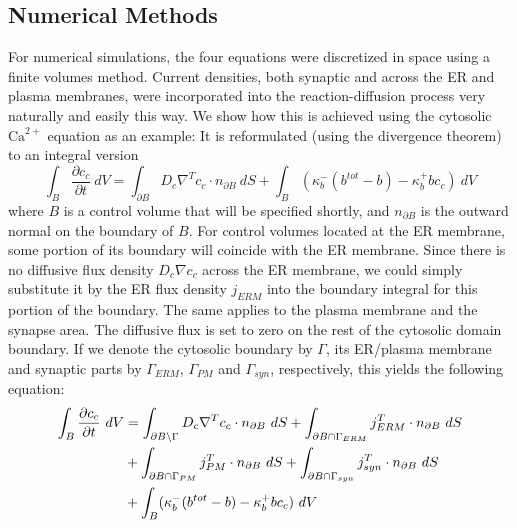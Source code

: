\documentclass[12pt]{article}
\begin{document}
\subsection*{Numerical Methods} For numerical simulations, the four equations were discretized in space using a finite volumes method. Current densities, both synaptic and across the ER and plasma membranes, were incorporated into the reaction-diffusion process very naturally and easily this way. We show how this is achieved using the cytosolic $\textrm{Ca}^{2+}$ equation as an example: It is reformulated (using the divergence theorem) to an integral version 
\begin{equation}
    \int_B \frac{\partial c_c}{\partial t}\ dV = \int_{\partial B}D_c\nabla^Tc_c\cdot n_{\partial B}\ dS + \int_B (\kappa_b^-(b^{tot}-b)-\kappa_b^+bc_c)\ dV
\end{equation}
where $B$ is a control volume that will be specified shortly, and $n_{\partial B}$ is the outward normal on the boundary of $B$. For control volumes located at the ER membrane, some portion of its boundary will coincide with the ER membrane. Since there is no diffusive flux density $D_c\nabla c_c$ across the ER membrane, we could simply substitute it by the ER flux density $j_{ERM}$ into the boundary integral for this portion of the boundary. The same applies to the plasma membrane and the synapse area. The diffusive flux is set to zero on the rest of the cytosolic domain
boundary. If we denote the cytosolic boundary by $\Gamma$, its ER/plasma membrane and synaptic parts by $\Gamma_{ERM}$, $\Gamma_{PM}$ and $\Gamma_{syn}$, respectively, this yields the following equation:
\begin{align}
    \int_B \frac{\partial c_c}{\partial t}\ dV &=\int_{\partial B\setminus\Gamma}D_c\nabla^Tc_c\cdot n_{\partial B}\ dS+\int_{\partial B\cap \Gamma_{ERM}}j_{ERM}^T\cdot n_{\partial B}\ dS\notag \\
    &+\int_{\partial B\cap \Gamma_{PM}}j_{PM}^T \cdot n_{\partial B}\ dS+\int_{\partial B\cap \Gamma_{syn}}j_{syn}^T \cdot n_{\partial B}\ dS\notag \\
    &+\int_B (\kappa_b^-(b^{tot}-b)-\kappa_b^+bc_c)\ dV\label{eqn:eqnBig}
\end{align}
\end{document}
